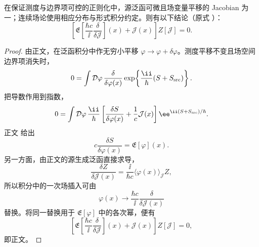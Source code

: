\begin{proposition}[泛函分部积分的主恒等式]
在保证测度与边界项可控的正则化中，源泛函可微且场变量平移的 Jacobian 为一；连续场论使用相应分布与形式积分约定。则有以下结论（原式 ）：
\begin{equation*}
 \boxed{
 \left[
 \mathfrak E\!\left[
 \frac{\hbar c}{\ii}\frac{\delta}{\delta\mathcal J}
 \right](x)
 +\mathcal J(x)
 \right]Z[\mathcal J]=0.}
\end{equation*}
\end{proposition}
\begin{proof}
由正文，在泛函积分中作无穷小平移 $\varphi\to\varphi+\delta\varphi$。测度平移不变且场空间边界项消失时，
\begin{equation*}
 0=
 \int\mathcal D\varphi\,
 \frac{\delta}{\delta\varphi(x)}
 \exp\!\left\{
 \frac{\ii}{\hbar}(S+S_{\rm src})
 \right\}.
\end{equation*}
把导数作用到指数，
\begin{equation*}
 0=
 \int\mathcal D\varphi\,
 \frac{\ii}{\hbar}
 \left[
 \frac{\delta S}{\delta\varphi(x)}
 +\frac1c\mathcal J(x)
 \right]
 \ee^{\ii(S+S_{\rm src})/\hbar}.
\end{equation*}
正文 给出
\begin{equation*}
 c\frac{\delta S}{\delta\varphi(x)}
 =\mathfrak E[\varphi](x).
\end{equation*}
另一方面，由正文的源生成泛函直接求导，
\begin{equation*}
 \frac{\delta Z}{\delta\mathcal J(x)}
 =\frac{\ii}{\hbar c}
 \langle\varphi(x)\rangle_{\mathcal J}Z,
\end{equation*}
所以积分中的一次场插入可由
\begin{equation*}
 \varphi(x)\longrightarrow
 \frac{\hbar c}{\ii}\frac{\delta}{\delta\mathcal J(x)}
\end{equation*}
替换。将同一替换用于 $\mathfrak E[\varphi]$ 中的各次幂，便有
\begin{equation*}
 \left[
 \mathfrak E\!\left[
 \frac{\hbar c}{\ii}\frac{\delta}{\delta\mathcal J}
 \right](x)
 +\mathcal J(x)
 \right]Z[\mathcal J]=0,
\end{equation*}
即正文。
\end{proof}

